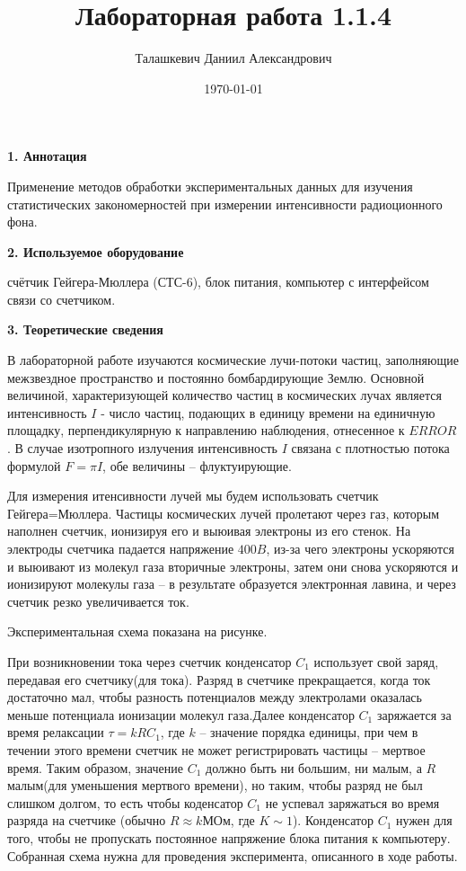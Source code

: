 \documentclass[a4paper,12pt]{article} %
\author{Талашкевич Даниил Александрович}
\title{Лабораторная работа 1.1.4}
\date{\today}
\begin{document}
\maketitle
\thispagestyle{empty}

\newpage
\setcounter{page}{1}


{\bf 1. Аннотация}

Применение методов обработки экспериментальных данных для изучения статистических закономерностей при измерении интенсивности радиоционного фона.

{\bf 2. Используемое оборудование}

счётчик Гейгера-Мюллера (СТС-6), блок питания, компьютер с интерфейсом связи со счетчиком.

{\bf 3. Теоретические сведения}

В лабораторной работе изучаются космические лучи-потоки частиц, заполняющие межзвездное пространство и постоянно бомбардирующие Землю. Основной величиной, характеризующей количество частиц в космических лучах является интенсивность $I$ - число частиц, подающих в единицу времени на единичную площадку, перпендикулярную к направлению наблюдения, отнесенное к $ERROR$. В случае изотропного излучения интенсивность $I$ связана с плотностью потока формулой $F = \pi I$, обе величины -- флуктуирующие.

Для измерения итенсивности лучей мы будем использовать счетчик Гейгера=Мюллера. Частицы космических лучей пролетают через газ, которым наполнен счетчик, ионизируя его и выюивая электроны из его стенок. На электроды счетчика падается напряжение $400B$, из-за чего электроны ускоряются и выюивают из молекул газа вторичные электроны, затем они снова ускоряются и ионизируют молекулы газа -- в результате образуется электронная лавина, и через счетчик резко увеличивается ток.

Экспериментальная схема показана на рисунке.


При возникновении тока через счетчик конденсатор $C_1$ использует свой заряд, передавая его счетчику(для тока). Разряд в счетчике прекращается, когда ток достаточно мал, чтобы разность потенциалов между электролами оказалась меньше потенциала ионизации молекул газа.Далее конденсатор $C_1$ заряжается за время релаксации $\tau = kRC_1$, где $k$ -- значение порядка единицы, при чем в течении этого времени счетчик не может регистрировать частицы -- мертвое время. Таким образом, значение $C_1$ должно быть ни большим, ни малым, а $R$ малым(для уменьшения мертвого времени), но таким, чтобы разряд не был слишком долгом, то есть чтобы коденсатор $C_1$ не успевал заряжаться во время разряда на счетчике (обычно $R \approx k \textbf{МОм}$, где $K \sim 1$). Конденсатор $C_1$ нужен для того, чтобы не пропускать постоянное напряжение блока питания к компьютеру. Собранная схема нужна для проведения эксперимента, описанного в ходе работы.
\end{document}
